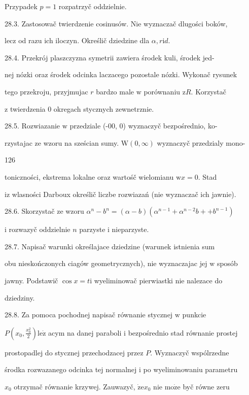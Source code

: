 \documentclass[a4paper,12pt]{article}
\begin{document}
Przypadek $p=1$ rozpatrzyč oddzielnie.

28.3. Zastosowač twierdzenie cosinusów. Nie wyznaczač dlugości boków,

lecz od razu ich iloczyn. Określič dziedzine dla $\alpha, r\mathrm{i}d.$

28.4. Przekrój plaszczyzna symetrii zawiera środek kuli, środek jed-

nej nózki oraz środek odcinka laczacego pozostale nózki. Wykonač rysunek

tego przekroju, przyjmujac $r$ bardzo male $\mathrm{w}$ porównaniu $\mathrm{z}R$. Korzystač

$\mathrm{z}$ twierdzenia $0$ okregach stycznych zewnetrznie.

28.5. Rozwiazanie $\mathrm{w}$ przedziale (-00, 0) wyznaczyč bezpośrednio, ko-

rzystajac ze wzoru na sześcian sumy. $\mathrm{W}(0,\infty)$ wyznaczyč przedzialy mono-





126

toniczności, ekstrema lokalne oraz wartośč wielomianu $\mathrm{w} x = 0$. Stad

$\mathrm{i}\mathrm{z}$ wlasności Darboux określič liczbe rozwiazań (nie wyznaczač ich jawnie).

28.6. Skorzystač ze wzoru $\alpha^{n}-b^{n}=(\alpha-b)(\alpha^{n-1}+\alpha^{n-2}b++b^{n-1})$

$\mathrm{i}$ rozwazyč oddzielnie $n$ parzyste $\mathrm{i}$ nieparzyste.

28.7. Napisač warunki określajace dziedzine (warunek istnienia sum

obu nieskończonych ciagów geometrycznych), nie wyznaczajac jej $\mathrm{w}$ sposób

jawny. Podstawič $\cos x = t \mathrm{i}$ wyeliminowač pierwiastki nie nalezace do

dziedziny.

28.8. Za pomoca pochodnej napisač równanie stycznej $\mathrm{w}$ punkcie

$P(x_{0},\displaystyle \frac{x_{0}^{2}}{2}) \mathrm{l}\mathrm{e}\dot{\mathrm{z}}$ acym na danej paraboli $\mathrm{i}$ bezpośrednio stad równanie prostej

prostopadlej do stycznej przechodzacej przez $P$. Wyznaczyč wspólrzedne

środka rozwazanego odcinka tej normalnej $\mathrm{i}$ po wyeliminowaniu parametru

$x_{0}$ otrzymač równanie krzywej. Zauwazyč, $\dot{\mathrm{z}}\mathrm{e}x_{0}$ nie $\mathrm{m}\mathrm{o}\dot{\mathrm{z}}\mathrm{e}$ byč równe zeru
\end{document}
